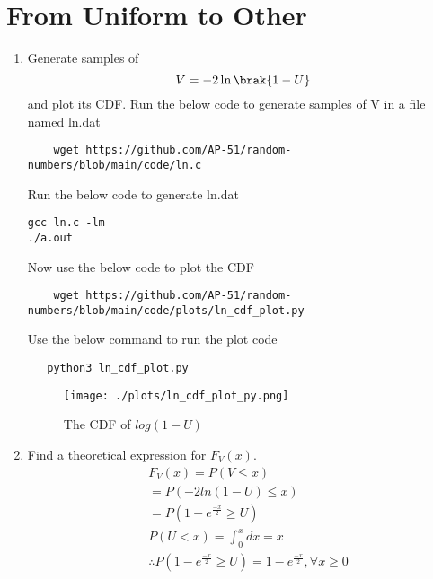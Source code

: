 \documentclass[journal,12pt,twocolumn]{IEEEtran}
\renewcommand\thesection{\arabic{section}}
\begin{document}
\section{From Uniform to Other}
\begin{enumerate}[label=\thesection.\arabic*
,ref=\thesection.\theenumi]
%
\item
Generate samples of 
%
\begin{equation}
V = -2\ln\brak{1-U}
\end{equation}
%
and plot its CDF. 
\solution Run the below code to generate samples of V in a file named ln.dat
\begin{lstlisting}
    wget https://github.com/AP-51/random-numbers/blob/main/code/ln.c
\end{lstlisting} 
Run the below code to generate ln.dat
\begin{lstlisting}
gcc ln.c -lm
./a.out
\end{lstlisting}
Now use the below code to plot the CDF
\begin{lstlisting}
    wget https://github.com/AP-51/random-numbers/blob/main/code/plots/ln_cdf_plot.py
\end{lstlisting}
Use the below command to run the plot code
\begin{lstlisting}
   python3 ln_cdf_plot.py 
\end{lstlisting}
\begin{figure}[h]
    \centering
    \texttt{[image: ./plots/ln\_cdf\_plot\_py.png]}
    \caption{The CDF of $log(1-U)$}
    \label{fig:ln_cdf}
    \end{figure}
\item Find a theoretical expression for $F_V(x)$.
\begin{align}
    &F_{V}(x)=P(V \leq x)\\
    &=P(-2 ln(1-U) \leq x)\\
    &=P(1-e^{\frac{-x}{2}} \geq U)\\
    &P(U<x)=\int_{0}^{x} dx=x\\
    &\therefore P(1-e^{\frac{-x}{2}} \geq U)=1-e^{\frac{-x}{2}}, \forall x\geq 0 \\ 
    \nonumber
 \end{align}

\end{enumerate}
\end{document}

